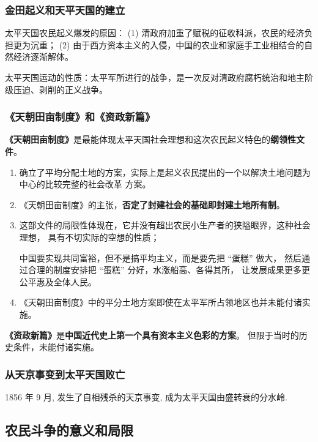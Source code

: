 \documentclass[utf-8, 10pt]{article}
\begin{document}
\subsubsection{金田起义和天平天国的建立}

太平天国农民起义爆发的原因： (1) 清政府加重了赋税的征收科派，农民的经济负担更为沉重；
(2) 由于西方资本主义的入侵，中国的农业和家庭手工业相结合的自然经济逐渐解体。

太平天国运动的性质：太平军所进行的战争，是一次反对清政府腐朽统治和地主阶级压迫、剥削的正义战争。

\subsubsection{《天朝田亩制度》和《资政新篇》}

\textbf{《天朝田亩制度》}是最能体现太平天国社会理想和这次农民起义特色的\textbf{纲领性文件}。
\begin{enumerate}[label=(\arabic*), itemsep=0pt]
    \item 确立了平均分配土地的方案，实际上是起义农民提出的一个以解决土地问题为中心的比较完整的社会改革
    方案。
    \item《天朝田亩制度》的主张，\textbf{否定了封建社会的基础即封建土地所有制}。
    \item 这部文件的局限性体现在，它并没有超出农民小生产者的狭隘眼界，这种社会理想，
    具有不切实际的空想的性质；
    \begin{remark}
        中国要实现共同富裕，但不是搞平均主义，而是要先把 “蛋糕” 做大，
        然后通过合理的制度安排把 “蛋糕” 分好，水涨船高、各得其所，
        让发展成果更多更公平惠及全体人民。
    \end{remark}
    \item 《天朝田亩制度》中的平分土地方案即使在太平军所占领地区也并未能付诸实施。
\end{enumerate}

\textbf{《资政新篇》}是\textbf{中国近代史上第一个具有资本主义色彩的方案}。
但限于当时的历史条件，未能付诸实施。

\subsubsection{从天京事变到太平天国败亡}

1856 年 9 月, 发生了自相残杀的天京事变, 成为太平天国由盛转衰的分水岭.

\subsection{农民斗争的意义和局限}
\end{document}
